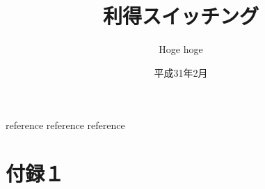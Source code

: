 \documentclass{jreport}
\title{利得スイッチング}
\author{Hoge hoge}
\date{平成31年2月}
\begin{document}
\maketitle
%
\tableofcontents
\listoffigures
\listoftables






\begin{thebibliography}{99}
 reference
 reference
 reference
%
\end{thebibliography}


\appendix
\chapter{付録１}
\end{document}
